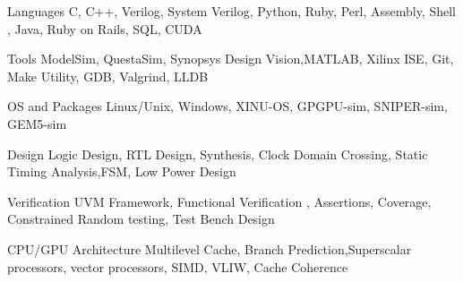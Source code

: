 

\begin{cvskills}

  \cvskill
    {Languages} %
    {C, C++, Verilog, System Verilog, Python, Ruby, Perl, Assembly, Shell , Java, Ruby on Rails, SQL, CUDA} %

  \cvskill
    {Tools} %
    {ModelSim, QuestaSim, Synopsys Design Vision,MATLAB, Xilinx ISE, Git, Make Utility, GDB, Valgrind, LLDB} %

    \cvskill
    {OS and Packages} %
    {Linux/Unix, Windows, XINU-OS, GPGPU-sim, SNIPER-sim, GEM5-sim} %

  \cvskill
    {Design} %
    { Logic Design, RTL Design, Synthesis, Clock Domain Crossing, Static Timing Analysis,FSM, Low Power Design} %

  \cvskill
    {Verification} %
    {UVM Framework, Functional Verification , Assertions, Coverage, Constrained Random testing, Test Bench Design} %

  \cvskill
    {CPU/GPU Architecture} %
    {Multilevel Cache, Branch Prediction,Superscalar processors, vector processors, SIMD, VLIW, Cache Coherence} %

  

\end{cvskills}

